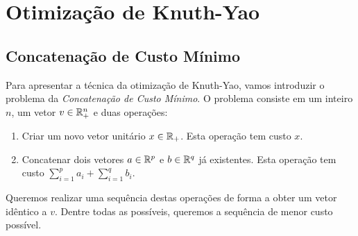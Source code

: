 
\chapter{Otimização de Knuth-Yao} %

\label{Knuth-Yao} %




\section{Concatenação de Custo Mínimo}

Para apresentar a técnica da otimização de Knuth-Yao, vamos introduzir o problema da \textit{Concatenação de Custo Mínimo}. O problema consiste em um inteiro $n$, um vetor $v \in \mathbb{R}^n_+$ e duas operações:

\begin{enumerate}
\item Criar um novo vetor unitário $x \in \mathbb{R}_+$. Esta operação tem custo $x$.
\item Concatenar dois vetores $a \in \mathbb{R}^p$ e $b \in \mathbb{R}^q$ já existentes. Esta operação tem custo $\sum \limits_{i=1}^p a_i + \sum \limits_{i=1}^q b_i$.
\end{enumerate}

Queremos realizar uma sequência destas operações de forma a obter um vetor idêntico a $v$. Dentre todas as possíveis, queremos a sequência de menor custo possível. \\

